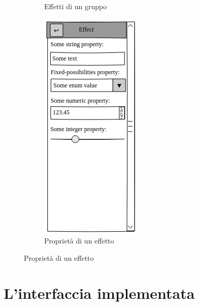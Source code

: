\documentclass[%
]{beamer}
\begin{document}
\begin{frame}
\begin{figure}[htbp]
\begin{subfigure}{.2\textwidth}
                        \caption{Effetti di un gruppo}
                        \label{fig:mock:effects}
                    \end{subfigure}
                    \qquad{\LARGE$\Rightarrow$}\qquad
                    \pause
                    \begin{subfigure}{.2\textwidth}
                        \includegraphics[scale=0.4]{mock/crop/properties}
                        \caption{Proprietà di un effetto}
                        \label{fig:mock:properties}
                    \end{subfigure}
                \end{figure}
            \end{frame}

    \section{L'interfaccia implementata}\label{sec:newgui}
\end{document}
